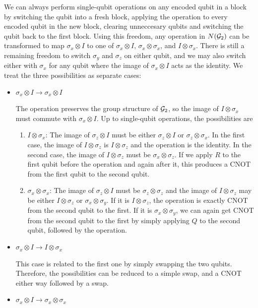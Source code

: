 \documentclass{report}
\newcommand{\G}{{\cal G}}
\newcommand{\X}{\sigma_x}
\newcommand{\Z}{\sigma_z}
\newcommand{\Y}{\sigma_y}
\begin{document}
We can always perform single-qubit operations on any encoded qubit in a 
block by switching the qubit into a fresh block, applying the operation to 
every encoded qubit in the new block, clearing unneccesary qubits and 
switching the qubit back to the first block.  Using this freedom, any 
operation in $N(\G_2)$ can be transformed to map $\X \otimes I$ to one of 
$\X \otimes I$, $\X \otimes \X$, and $I \otimes \X$.  There is still a 
remaining freedom to switch $\Y$ and $\Z$ on either qubit, and we may 
also switch either with $\X$ for any qubit where the image of $\X \otimes 
I$ acts as the identity.  We treat the three possibilities as separate cases:
\begin{itemize}
\item $\X \otimes I \rightarrow \X \otimes I$

The operation preserves the group structure of $\G_2$, so the image of $I 
\otimes \X$ must commute with $\X \otimes I$.  Up to single-qubit 
operations, the possibilities are

\begin{enumerate}
\item $I \otimes \X$: The image of $\Z \otimes I$ must be either $\Z 
\otimes I$ or $\Z \otimes \X$.  In the first case, the image of $I \otimes 
\Z$ is $I \otimes \Z$ and the operation is the identity.  In the second case, 
the image of $I \otimes \Z$ must be $\X \otimes \Z$.  If we apply $R$ to 
the first qubit before the operation and again after it, this produces a CNOT 
from the first qubit to the second qubit.

\item $\X \otimes \X$: The image of $\Z \otimes I$ must be $\Z \otimes 
\Z$ and the image of $I \otimes \Z$ may be either $I \otimes \Z$ or $\X 
\otimes \Y$.  If it is $I \otimes \Z$, the operation is exactly CNOT from the 
second qubit to the first.  If it is $\X \otimes \Y$, we can again get CNOT 
from the second qubit to the first by simply applying $Q$ to the second 
qubit, followed by the operation.
\end{enumerate}

\item $\X \otimes I \rightarrow I \otimes \X$

This case is related to the first one by simply swapping the two qubits.  
Therefore, the possibilities can be reduced to a simple swap, and a CNOT 
either way followed by a swap.

\item $\X \otimes I \rightarrow \X \otimes \X$


\end{itemize}
\end{document}
